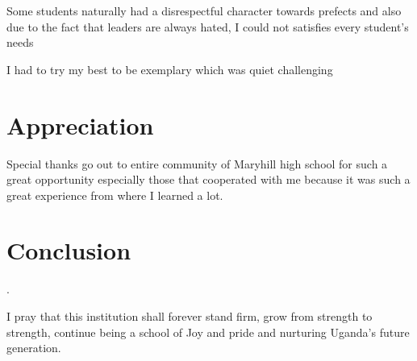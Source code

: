 \documentclass[12]{article}
\begin{document}
Some students naturally had a disrespectful character towards prefects and also due to the fact that leaders are always hated, I could not satisfies every student’s needs

I had to try my best to be exemplary which was quiet challenging
\section{Appreciation}
Special thanks go out to entire community of Maryhill high school for such a great opportunity especially those that cooperated with me because it was such a great experience from where I learned a lot.

\section{Conclusion}.

I pray that this institution shall forever stand firm, grow from strength to strength, continue being a school of Joy and pride and nurturing Uganda’s future generation.
\end{document}

